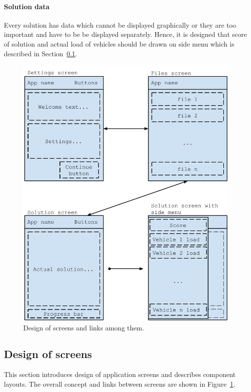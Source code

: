 \paragraph{Solution data}
Every solution has data which cannot be displayed graphically or they are too important and have to be be displayed
separately. Hence, it is designed that score of solution and actual load of vehicles should be drawn on side menu which
is described in Section~\ref{ScreenDesignSection}.

\begin{figure}[h!]
    \centering
    \includegraphics[scale=0.7]{fig/sceen_design.pdf}
    \caption{Design of screens and links among them.}
    \label{ScreenDesignFigure}
\end{figure}

\subsection{Design of screens}\label{ScreenDesignSection}
This section introduces design of application screens and describes component layouts. The overall concept and links
between screens are shown in Figure~\ref{ScreenDesignFigure}.

